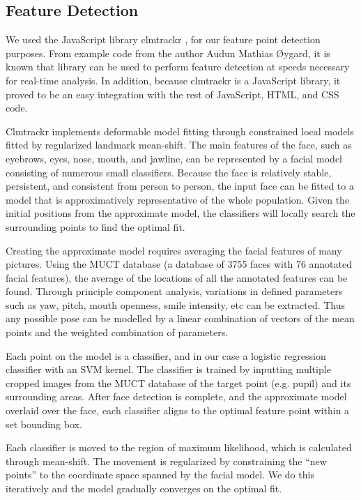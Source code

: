 \documentclass[10pt,twocolumn,letterpaper]{article}
\begin{document}
\subsection{Feature Detection}

We used the JavaScript library clmtrackr \cite{clmtrackr}, for our feature point detection purposes. From example code from the author Audun Mathias \O ygard, it is known that library can be used to perform feature detection at speeds necessary for real-time analysis. In addition, because clmtrackr is a JavaScript library, it proved to be an easy integration with the rest of JavaScript, HTML, and CSS code.

Clmtrackr implements deformable model fitting through constrained local models fitted by regularized landmark mean-shift. The main features of the face, such as eyebrows, eyes, nose, mouth, and jawline, can be represented by a facial model consisting of numerous small classifiers. Because the face is relatively stable, persistent, and consistent from person to person, the input face can be fitted to a model that is approximatively representative of the whole population. Given the initial positions from the approximate model, the classifiers will locally search the surrounding points to find the optimal fit.

Creating the approximate model requires averaging the facial features of many pictures. Using the MUCT database (a database of 3755 faces with 76 annotated facial features), the average of the locations of all the annotated features can be found. Through principle component analysis, variations in defined parameters such as yaw, pitch, mouth openness, smile intensity, etc can be extracted. Thus any possible pose can be modelled by a linear combination of vectors of the mean points and the weighted combination of parameters.

Each point on the model is a classifier, and in our case a logistic regression classifier with an SVM kernel. The classifier is trained by inputting multiple cropped images from the MUCT database of the target point (e.g. pupil) and its surrounding areas. After face detection is complete, and the approximate model overlaid over the face, each classifier aligns to the optimal feature point within a set bounding box.

Each classifier is moved to the region of maximum likelihood, which is calculated through mean-shift. The movement is regularized by constraining the ``new points'' to the coordinate space spanned by the facial model. We do this iteratively and the model gradually converges on the optimal fit. 
\end{document}
